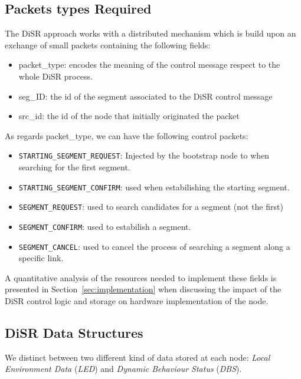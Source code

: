 
\subsection{Packets types Required}

The DiSR approach works with a distributed mechanism which is build
upon an exchange of small packets containing the following fields:
\begin{itemize}
\item{packet\_type}: encodes the meaning of the control message respect
to the whole DiSR process.
\item{seg\_ID}: the id of the segment associated to the DiSR control message
\item{src\_id}: the id of the node that initially originated the
packet
\end{itemize}

As regards packet\_type, we can have the following control packets:
\begin{itemize}
\item{\texttt{STARTING\_SEGMENT\_REQUEST}}: Injected by the bootstrap
node to when searching for the first segment. 
\item{\texttt{STARTING\_SEGMENT\_CONFIRM}}: used when estabilishing
the starting  segment. 
\item{\texttt{SEGMENT\_REQUEST}}: used to search candidates for a segment (not the
first)
\item{\texttt{SEGMENT\_CONFIRM}}: used to estabilish a segment. 
\item{\texttt{SEGMENT\_CANCEL}}: used to cancel the process of searching a segment along a
specific link.
\end{itemize}

A quantitative analysis of the resources needed to implement these
fields is presented in Section~\ref{sec:implementation} when
discussing the impact of the DiSR control logic and storage on
hardware implementation of the node.

\subsection{DiSR Data Structures}
\label{ssec:disr_dstruct}

We distinct between two different kind of data stored at each node:
\emph{Local Environment Data} (\emph{LED}) and \emph{Dynamic Behaviour
Status} (\emph{DBS}).

